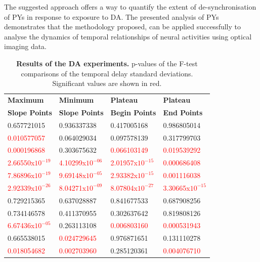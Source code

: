 The suggested approach offers a way to quantify the extent of de-synchronisation of \acp{PY} in response to exposure to \ac{DA}. The presented analysis of \acp{PY} demonstrates that the methodology proposed, can be applied successfully to analyse the dynamics of temporal relationships of neural activities using optical imaging data.

\begin{table}[H]
	\small
	\centering
	\caption[Results of the \ac{DA} experiments.]{\textbf{Results of the \ac{DA} experiments.} p-values of the F-test comparisons of the temporal delay standard deviations. Significant values are shown in red.}
	\label{tab:da_results}
	\begin{tabular}{p{30mm} p{30mm} p{30mm} p{20mm}}
		\hline
		\textbf{Maximum} & \textbf{Minimum} & \textbf{Plateau} & \textbf{Plateau} \\
		\textbf{Slope Points} & \textbf{Slope Points} & \textbf{Begin Points} & \textbf{End Points} \\
		\hline
		
		0.657721015 & 0.936337338 & 0.417005168 &  0.986805014 \\
		\textcolor{red}{0.010577057} & 0.064029034 & 0.097578139 & 0.317799703 \\
		\textcolor{red}{0.000196868} & 0.303675632 & \textcolor{red}{0.066103149} & \textcolor{red}{0.019539292} \\
		\textcolor{red}{2.66550x${10^{-19}}$} & \textcolor{red}{4.10299x${10^{-06}}$} & \textcolor{red}{2.01957x${10^{-15}}$} & \textcolor{red}{0.000686408} \\
		\textcolor{red}{7.86896x${10^{-19}}$} & \textcolor{red}{9.69148x${10^{-05}}$} & \textcolor{red}{2.93382x${10^{-15}}$} & \textcolor{red}{0.001116038} \\
		\textcolor{red}{2.92339x${10^{-26}}$} & \textcolor{red}{8.04271x${10^{-09}}$} & \textcolor{red}{8.07804x${10^{-27}}$} & \textcolor{red}{3.30665x${10^{-15}}$} \\
		0.729215365 & 0.637028887 & 0.841677533 & 0.687908256 \\
		0.734146578 & 0.411370955 & 0.302637642 & 0.819808126 \\
		\textcolor{red}{6.67436x${10^{-05}}$} & 0.263113108 & \textcolor{red}{0.006803160} & \textcolor{red}{ 0.000531943} \\
		0.665538015 & \textcolor{red}{0.024729645} & 0.976871651 & 0.131110278 \\
		\textcolor{red}{0.018054682} & \textcolor{red}{0.002703960} & 0.285120361 & \textcolor{red}{0.004076710} \\
		\hline
	\end{tabular}
\end{table}

